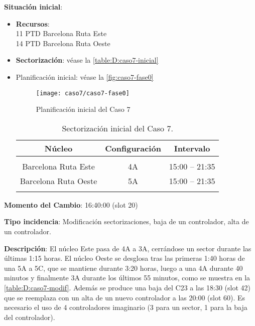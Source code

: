 \textbf{Situación inicial}:
\begin{itemize}[label={}]
	
	\item \textbf{Recursos}: \\
	11 PTD Barcelona Ruta Este \\
	14 PTD Barcelona Ruta Oeste
	
	
	\item \textbf{Sectorización}: véase la \autoref{table:D:caso7-inicial}
	
	\item Planificación inicial: véase la \autoref{fig:caso7-fase0}
	
	\begin{figure}[!h]
		\centering
		\texttt{[image: caso7/caso7-fase0]}
		\caption{Planificación inicial del Caso 7}
		\label{fig:caso7-fase0}
	\end{figure}

	\begin{table}[h]
		\centering
		\caption{Sectorización inicial del Caso 7.}
		\label{table:D:caso7-inicial}
		\begin{tabular}{ccc}
			\hline
			\multicolumn{1}{c}{\textbf{Núcleo}} & \multicolumn{1}{c}{\textbf{Configuración}} & \multicolumn{1}{c}{\textbf{Intervalo}} \\ \hline
			&                                            &                                        \\
			Barcelona Ruta Este                 & 4A                                         & 15:00 -- 21:35                         \\
			Barcelona Ruta   Oeste              & 5A                                         & 15:00 -- 21:35                         \\
			\multicolumn{1}{c}{}                &                                            &                                        \\ \hline
		\end{tabular}
	\end{table}
\end{itemize}

\textbf{Momento del Cambio}: 16:40:00 (slot 20)

\textbf{Tipo incidencia}: Modificación sectorizaciones, baja de un controlador, alta de un controlador.

\textbf{Descripción}: El núcleo Este pasa de 4A a 3A, cerrándose un sector durante las últimas 1:15 horas. El núcleo Oeste se desglosa tras las primeras 1:40 horas de una 5A a 5C, que se mantiene durante 3:20 horas, luego a una 4A durante 40 minutos y finalmente 3A durante los últimos 55 minutos, como se muestra en la \autoref{table:D:caso7-modif}. Además se produce una baja del C23 a las 18:30 (slot 42) que se reemplaza con un alta de un nuevo controlador a las 20:00 (slot 60). Es necesario el uso de 4 controladores imaginario (3 para un sector, 1 para la baja del controlador).

